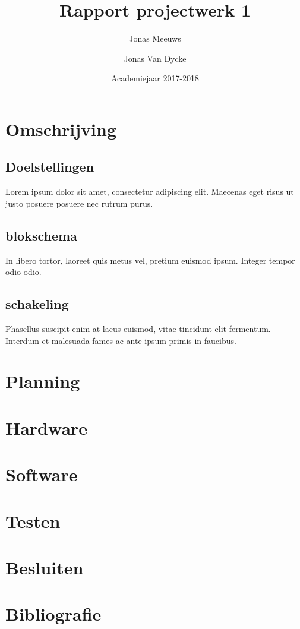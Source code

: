 \documentclass[a4paper]{report}
\title{Rapport projectwerk 1}
\author{Jonas Meeuws \and Jonas Van Dycke}
\date{Academiejaar 2017-2018}
\begin{document}
\maketitle
\tableofcontents

\chapter{Omschrijving}
\section{Doelstellingen}
Lorem ipsum dolor sit amet, consectetur adipiscing elit.
Maecenas eget risus ut justo posuere posuere nec rutrum purus.
\section{blokschema}
In libero tortor, laoreet quis metus vel, pretium euismod ipsum.
Integer tempor odio odio.
\section{schakeling}
Phasellus suscipit enim at lacus euismod, vitae tincidunt elit fermentum.
Interdum et malesuada fames ac ante ipsum primis in faucibus.

\chapter{Planning}

\chapter{Hardware}

\chapter{Software}

\chapter{Testen}

\chapter{Besluiten}

\chapter{Bibliografie}
\end{document}
